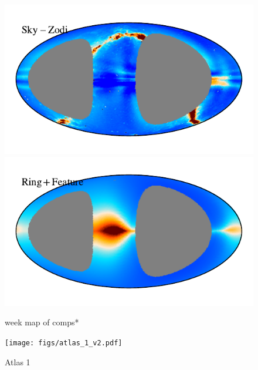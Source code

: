 \documentclass{aa}
\begin{document}
\begin{figure}
\includegraphics[width=0.9\columnwidth]{figs/zodi_comps/zodi_res_98_week.pdf}\includegraphics[width=0.9\columnwidth]{figs/zodi_comps/zodi_ring+feature_98_week.pdf}
\caption{week map of comps*}
\label{fig: K98 week comparison}
\end{figure}


\begin{figure}
  \centering
   	\texttt{[image: figs/atlas\_1\_v2.pdf]}
  	\caption{Atlas 1}
	\label{fig: atlas1}
\end{figure}
\end{document}
